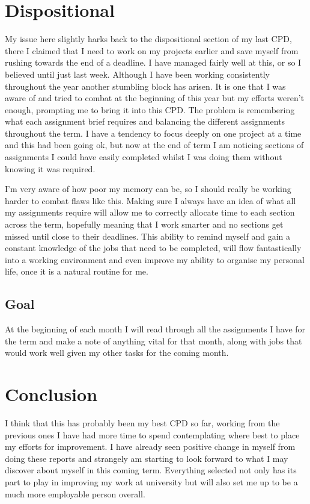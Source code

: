 \documentclass{scrartcl}
\begin{document}
\section{Dispositional}
My issue here slightly harks back to the dispositional section of my last CPD, there I claimed that I need to work on my projects earlier and save myself from rushing towards the end of a deadline. I have managed fairly well at this, or so I believed until just last week. Although I have been working consistently throughout the year another stumbling block has arisen. It is one that I was aware of and tried to combat at the beginning of this year but my efforts weren't enough, prompting me to bring it into this CPD. The problem is remembering what each assignment brief requires and balancing the different assignments throughout the term. I have a tendency to focus deeply on one project at a time and this had been going ok, but now at the end of term I am noticing sections of assignments I could have easily completed whilst I was doing them without knowing it was required. 

I'm very aware of how poor my memory can be, so I should really be working harder to combat flaws like this. Making sure I always have an idea of what all my assignments require will allow me to correctly allocate time to each section across the term, hopefully meaning that I work smarter and no sections get missed until close to their deadlines. This ability to remind myself and gain a constant knowledge of the jobs that need to be completed, will flow fantastically into a working environment and even improve my ability to organise my personal life, once it is a natural routine for me.
\subsection{Goal}
At the beginning of each month I will read through all the assignments I have for the term and make a note of anything vital for that month, along with jobs that would work well given my other tasks for the coming month.

\section{Conclusion}
I think that this has probably been my best CPD so far, working from the previous ones I have had more time to spend contemplating where best to place my efforts for improvement. I have already seen positive change in myself from doing these reports and strangely am starting to look forward to what I may discover about myself in this coming term. Everything selected not only has its part to play in improving my work at university but will also set me up to be a much more employable person overall.
\end{document}
